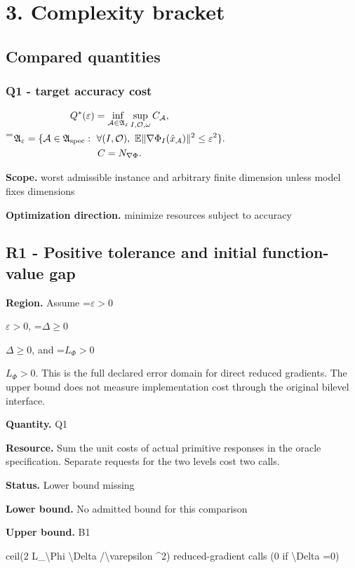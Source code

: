 \documentclass[10pt,a4paper]{article}
\newcommand{\AtlasMath}[1]{\par\begingroup\centering\setbox0=\hbox{$\displaystyle #1$}\ifdim\wd0>1.4\linewidth\typeout{ATLAS WIDE FORMULA: \the\wd0}\fi\ifdim\wd0>\linewidth\resizebox{\linewidth}{!}{\box0}\else\box0\fi\par\endgroup}
\newcommand{\AtlasInlineMath}[1]{\begingroup\setbox0=\hbox{$#1$}\ifdim\wd0>.4\linewidth\endgroup\AtlasMath{#1}\else\endgroup$#1$\fi}
\begin{document}
\section{3. Complexity bracket}
\subsection{Compared quantities}
\subsubsection{Q1 - target accuracy cost}
\AtlasMath{\begin{gathered}Q^*(\varepsilon)=\inf_{\mathcal A\in\mathfrak A_\varepsilon}\sup_{I,\mathcal O,\omega}C_{\mathcal A},\\\mathfrak A_\varepsilon=\{\mathcal A\in\mathfrak A_{\rm spec}:\ \forall(I,\mathcal O),\ \mathbb E\|\nabla\Phi_I(\hat x_{\mathcal A})\|^2\le\varepsilon^2\}.\\C=N_{\nabla\Phi}.\end{gathered}}
\textbf{Scope.} worst admissible instance and arbitrary finite dimension unless model fixes dimensions

\textbf{Optimization direction.} minimize resources subject to accuracy

\subsection{R1 - Positive tolerance and initial function-value gap}
\textbf{Region.} Assume \AtlasInlineMath{\varepsilon>0}, \AtlasInlineMath{\Delta\ge0}, and \AtlasInlineMath{L_\Phi>0}. This is the full declared error domain for direct reduced gradients. The upper bound does not measure implementation cost through the original bilevel interface.

\textbf{Quantity.} Q1

\textbf{Resource.} Sum the unit costs of actual primitive responses in the oracle specification. Separate requests for the two levels cost two calls.

\textbf{Status.} Lower bound missing

\textbf{Lower bound.} No admitted bound for this comparison

\textbf{Upper bound.} B1

ceil(2 L\_\textbackslash{}Phi  \textbackslash{}Delta /\textbackslash{}varepsilon \textasciicircum{}2) reduced-gradient calls (0 if \textbackslash{}Delta =0)
\end{document}

